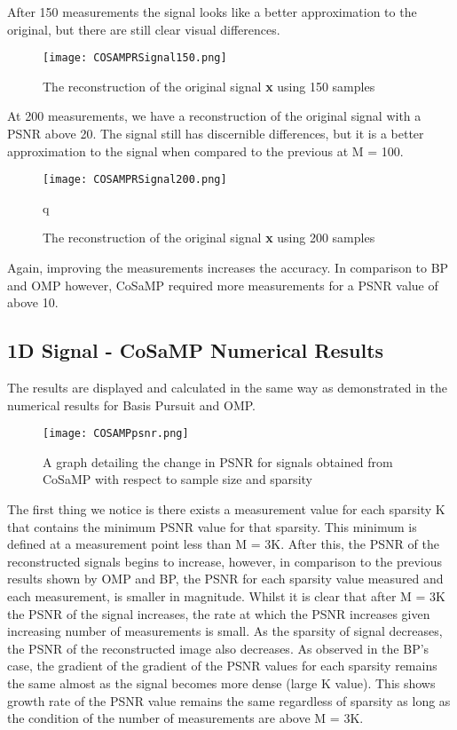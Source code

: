 \documentclass[titlepage,oneside, 12pt]{book}
\theoremstyle{break}
\begin{document}
After 150 measurements the signal looks like a better approximation to the original, but there are still clear visual differences.

\begin{figure}[H]
\centering
\centerline{\texttt{[image: COSAMPRSignal150.png]}}
\caption{The reconstruction of the original signal \textbf{x} using 150 samples}
\label{fig:COSAMPRSignal150}
\end{figure}

At 200 measurements, we have a reconstruction of the original signal with a PSNR above 20. The signal still has discernible differences, but it is a better approximation to the signal when compared to the previous at M = 100. 

\begin{figure}[H]
\centering
\centerline{\texttt{[image: COSAMPRSignal200.png]}}
\caption{The reconstruction of the original signal \textbf{x} using 200 samples}q
\label{fig:COSAMPRSignal200}
\end{figure}

Again, improving the measurements increases the accuracy. In comparison to BP and OMP however, CoSaMP required more measurements for a PSNR value of above 10. 

\newpage
\subsection{1D Signal - CoSaMP Numerical Results}

The results are displayed and calculated in the same way as demonstrated in the numerical results for Basis Pursuit and OMP. 

\begin{figure}[h]
\centering
\centerline{\texttt{[image: COSAMPpsnr.png]}}
\caption{A graph detailing the change in PSNR for signals obtained from CoSaMP with respect to sample size and sparsity}
\label{fig:psnrCOSAMP}
\end{figure}

The first thing we notice is there exists a measurement value for each sparsity K that contains the minimum PSNR value for that sparsity. This minimum is defined at a measurement point less than M = 3K. After this, the PSNR of the reconstructed signals begins to increase, however, in comparison to the previous results shown by OMP and BP, the PSNR for each sparsity value measured and each measurement, is smaller in magnitude. 
Whilst it is clear that after M = 3K the PSNR of the signal increases, the rate at which the PSNR increases given increasing number of measurements is small. As the sparsity of signal decreases, the PSNR of the reconstructed image also decreases. As observed in the BP's case, the gradient of the  gradient of the PSNR values for each sparsity remains the same almost as the signal becomes more dense (large K value). This shows growth rate of the PSNR value remains the same regardless of sparsity as long as the condition of the number of measurements are above M = 3K. 
\end{document}
